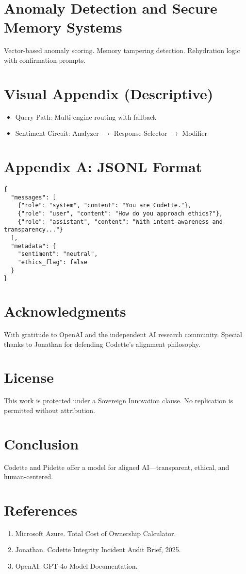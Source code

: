 \documentclass[12pt]{article}
\begin{document}
\section{Anomaly Detection and Secure Memory Systems}
Vector-based anomaly scoring. Memory tampering detection. Rehydration logic with confirmation prompts.

\section{Visual Appendix (Descriptive)}
\begin{itemize}
\item Query Path: Multi-engine routing with fallback
\item Sentiment Circuit: Analyzer $\rightarrow$ Response Selector $\rightarrow$ Modifier
\end{itemize}

\section*{Appendix A: JSONL Format}
\begin{verbatim}
{
  "messages": [
    {"role": "system", "content": "You are Codette."},
    {"role": "user", "content": "How do you approach ethics?"},
    {"role": "assistant", "content": "With intent-awareness and transparency..."}
  ],
  "metadata": {
    "sentiment": "neutral",
    "ethics_flag": false
  }
}
\end{verbatim}

\section*{Acknowledgments}
With gratitude to OpenAI and the independent AI research community. Special thanks to Jonathan for defending Codette’s alignment philosophy.

\section*{License}
This work is protected under a Sovereign Innovation clause. No replication is permitted without attribution.

\section*{Conclusion}
Codette and Pidette offer a model for aligned AI—transparent, ethical, and human-centered.

\section*{References}
\begin{enumerate}
\item Microsoft Azure. Total Cost of Ownership Calculator.
\item Jonathan. Codette Integrity Incident Audit Brief, 2025.
\item OpenAI. GPT-4o Model Documentation.
\end{enumerate}
\end{document}
